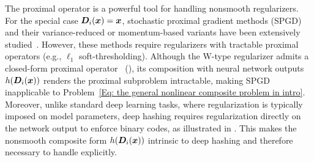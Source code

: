 {The proximal operator is a powerful tool for handling nonsmooth regularizers. For the special case $\bm{D}_i(\bm{x}) = \bm{x}$, stochastic proximal gradient methods (SPGD) and their variance-reduced or momentum-based variants have been extensively studied~\cite{li2022simple,xu2023momentum,gaoNonConvexStochasticComposite2024}. However, these methods require regularizers with tractable proximal operators (e.g., $\ell_1$ soft-thresholding). Although the W-type regularizer admits a closed-form proximal operator~\cite{bai2019proxquant} (), its composition with neural network outputs $h(\bm{D}_i(\bm{x}))$ renders the proximal subproblem intractable, making SPGD inapplicable to Problem~\eqref{Eq: the general nonlinear composite problem in intro}. Moreover, unlike standard deep learning tasks, where regularization is typically imposed on model parameters, deep hashing requires regularization directly on the network output to enforce binary codes, as illustrated in .} This makes the nonsmooth composite form \(h(\bm{D}_i(\bm{x}))\) intrinsic to deep hashing and therefore necessary to handle explicitly.
